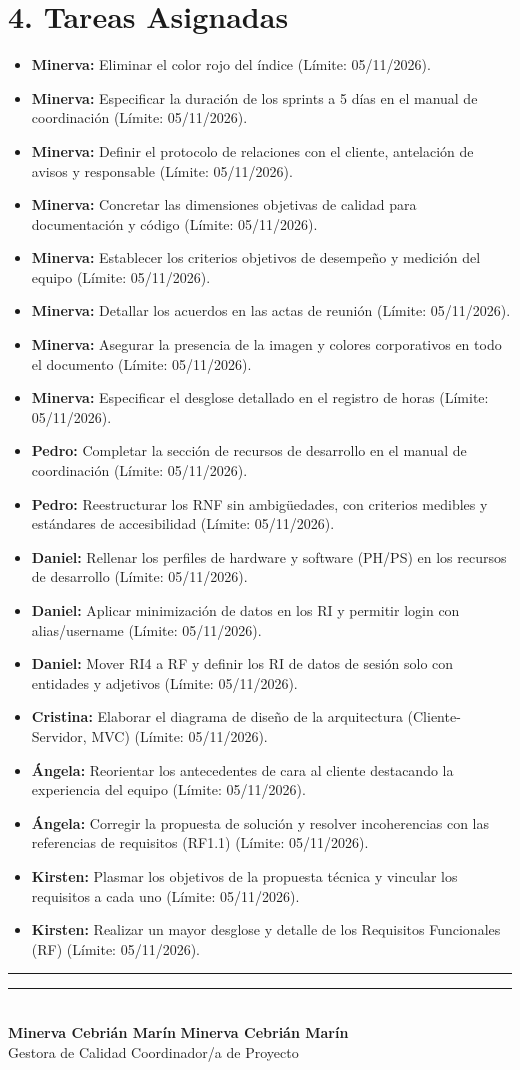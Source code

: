 \section*{4. Tareas Asignadas}
\begin{itemize}
    \item \textbf{Minerva:} Eliminar el color rojo del índice (Límite: 05/11/2026).
    \item \textbf{Minerva:} Especificar la duración de los sprints a 5 días en el manual de coordinación (Límite: 05/11/2026).
    \item \textbf{Minerva:} Definir el protocolo de relaciones con el cliente, antelación de avisos y responsable (Límite: 05/11/2026).
    \item \textbf{Minerva:} Concretar las dimensiones objetivas de calidad para documentación y código (Límite: 05/11/2026).
    \item \textbf{Minerva:} Establecer los criterios objetivos de desempeño y medición del equipo (Límite: 05/11/2026).
    \item \textbf{Minerva:} Detallar los acuerdos en las actas de reunión (Límite: 05/11/2026).
    \item \textbf{Minerva:} Asegurar la presencia de la imagen y colores corporativos en todo el documento (Límite: 05/11/2026).
    \item \textbf{Minerva:} Especificar el desglose detallado en el registro de horas (Límite: 05/11/2026).
    \item \textbf{Pedro:} Completar la sección de recursos de desarrollo en el manual de coordinación (Límite: 05/11/2026).
    
    \item \textbf{Pedro:} Reestructurar los RNF sin ambigüedades, con criterios medibles y estándares de accesibilidad (Límite: 05/11/2026).
    \item \textbf{Daniel:} Rellenar los perfiles de hardware y software (PH/PS) en los recursos de desarrollo (Límite: 05/11/2026).
    \item \textbf{Daniel:} Aplicar minimización de datos en los RI y permitir login con alias/username (Límite: 05/11/2026).
    \item \textbf{Daniel:} Mover RI4 a RF y definir los RI de datos de sesión solo con entidades y adjetivos (Límite: 05/11/2026).
    \item \textbf{Cristina:} Elaborar el diagrama de diseño de la arquitectura (Cliente-Servidor, MVC) (Límite: 05/11/2026).
    \item \textbf{Ángela:} Reorientar los antecedentes de cara al cliente destacando la experiencia del equipo (Límite: 05/11/2026).
    \item \textbf{Ángela:} Corregir la propuesta de solución y resolver incoherencias con las referencias de requisitos (RF1.1) (Límite: 05/11/2026).
    \item \textbf{Kirsten:} Plasmar los objetivos de la propuesta técnica y vincular los requisitos a cada uno (Límite: 05/11/2026).
    \item \textbf{Kirsten:} Realizar un mayor desglose y detalle de los Requisitos Funcionales (RF) (Límite: 05/11/2026).
\end{itemize}

\noindent
\rule{6cm}{0.4pt} \hfill \rule{6cm}{0.4pt}\\
\textbf{Minerva Cebrián Marín} \hfill \textbf{Minerva Cebrián Marín}\\
Gestora de Calidad \hfill Coordinador/a de Proyecto




